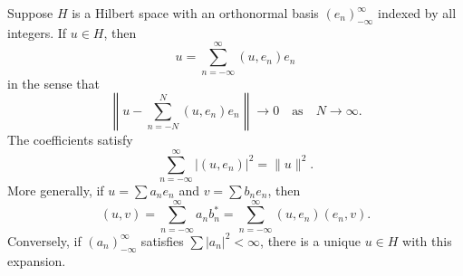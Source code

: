 Suppose $H$ is a Hilbert space with an orthonormal basis $(e_n)_{-\infty}^{\infty}$ indexed by all integers. If $u \in H$, then
$$u = \sum_{n=-\infty}^{\infty} (u, e_n) e_n$$
in the sense that
$$\left\| u - \sum_{n=-N}^{N} (u, e_n) e_n \right\| \to 0 \quad \text{as} \quad N \to \infty.$$
The coefficients satisfy
$$\sum_{n=-\infty}^{\infty} |(u, e_n)|^2 = \|u\|^2.$$
More generally, if $u = \sum a_n e_n$ and $v = \sum b_n e_n$, then
$$(u, v) = \sum_{n=-\infty}^{\infty} a_n b_n^* = \sum_{n=-\infty}^{\infty} (u, e_n)(e_n, v).$$
Conversely, if $(a_n)_{-\infty}^{\infty}$ satisfies $\sum |a_n|^2 < \infty$, there is a unique $u \in H$ with this expansion.
